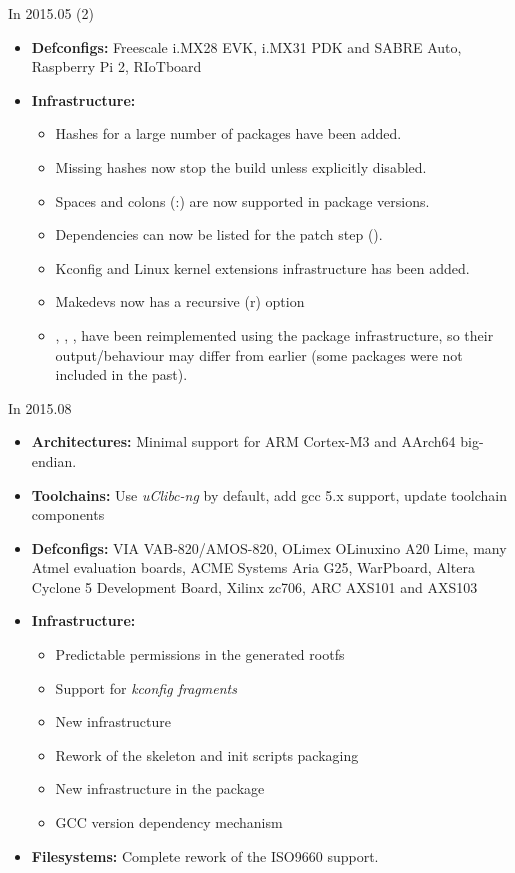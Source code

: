 \begin{frame}{In 2015.05 (2)}
  \begin{itemize}
  \item {\bf Defconfigs:} Freescale i.MX28 EVK, i.MX31 PDK and SABRE
    Auto, Raspberry Pi 2, RIoTboard
  \item {\bf Infrastructure:}
    \begin{itemize}
    \item Hashes for a large number of packages have
      been added.
    \item Missing hashes now stop the build unless
      explicitly disabled.
    \item Spaces and colons (:) are now supported in package versions.
    \item Dependencies can now be listed for the patch step
      ().
    \item Kconfig and Linux kernel extensions infrastructure has
      been added.
    \item Makedevs now has a recursive (r) option
    \item {}, , ,
       have been reimplemented using the package
      infrastructure, so their output/behaviour may differ from
      earlier (some packages were not included in the past).
    \end{itemize}
  \end{itemize}
\end{frame}

\begin{frame}{In 2015.08}
  \begin{itemize}
  \item {\bf Architectures:} Minimal support for ARM Cortex-M3 and
    AArch64 big-endian.
  \item {\bf Toolchains:} Use {\em uClibc-ng} by default, add gcc 5.x
    support, update toolchain components
  \item {\bf Defconfigs:} VIA VAB-820/AMOS-820, OLimex OLinuxino A20
    Lime, many Atmel evaluation boards, ACME Systems Aria G25,
    WarPboard, Altera Cyclone 5 Development Board, Xilinx zc706, ARC
    AXS101 and AXS103
  \item {\bf Infrastructure:}
    \begin{itemize}
    \item Predictable permissions in the generated rootfs
    \item Support for {\em kconfig fragments}
    \item New  infrastructure
    \item Rework of the skeleton and init scripts packaging
    \item New  infrastructure in the 
      package
    \item GCC version dependency mechanism
    \end{itemize}
  \item {\bf Filesystems:} Complete rework of the ISO9660 support.
  \end{itemize}
\end{frame}
